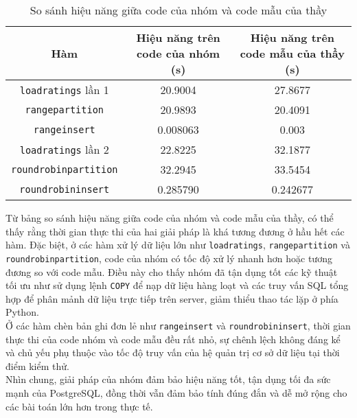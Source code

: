 \documentclass[a4paper]{article}
\begin{document}
\begin{table}[H]
    \centering
    \renewcommand{\arraystretch}{1.3}
    \begin{tabular}{|c|c|c|}
        \hline
        \textbf{Hàm} & \textbf{Hiệu năng trên code của nhóm (s)} & \textbf{Hiệu năng trên code mẫu của thầy (s)} \\
        \hline
        \texttt{loadratings} lần 1 & 20.9004 & 27.8677 \\
        \hline
        \texttt{rangepartition} & 20.9893 & 20.4091 \\
        \hline
        \texttt{rangeinsert} & 0.008063 & 0.003 \\
        \hline
        \texttt{loadratings} lần 2 & 22.8225 & 32.1877 \\
        \hline
        \texttt{roundrobinpartition} & 32.2945 & 33.5454 \\
        \hline
        \texttt{roundrobininsert} & 0.285790 & 0.242677 \\
        \hline
    \end{tabular}
    \caption{So sánh hiệu năng giữa code của nhóm và code mẫu của thầy}
\end{table}

Từ bảng so sánh hiệu năng giữa code của nhóm và code mẫu của thầy, có thể thấy rằng thời gian thực thi của hai giải pháp là khá tương đương ở hầu hết các hàm. Đặc biệt, ở các hàm xử lý dữ liệu lớn như \texttt{loadratings}, \texttt{rangepartition} và \texttt{roundrobinpartition}, code của nhóm có tốc độ xử lý nhanh hơn hoặc tương đương so với code mẫu. Điều này cho thấy nhóm đã tận dụng tốt các kỹ thuật tối ưu như sử dụng lệnh \texttt{COPY} để nạp dữ liệu hàng loạt và các truy vấn SQL tổng hợp để phân mảnh dữ liệu trực tiếp trên server, giảm thiểu thao tác lặp ở phía Python.\\

Ở các hàm chèn bản ghi đơn lẻ như \texttt{rangeinsert} và \texttt{roundrobininsert}, thời gian thực thi của code nhóm và code mẫu đều rất nhỏ, sự chênh lệch không đáng kể và chủ yếu phụ thuộc vào tốc độ truy vấn của hệ quản trị cơ sở dữ liệu tại thời điểm kiểm thử.\\

Nhìn chung, giải pháp của nhóm đảm bảo hiệu năng tốt, tận dụng tối đa sức mạnh của PostgreSQL, đồng thời vẫn đảm bảo tính đúng đắn và dễ mở rộng cho các bài toán lớn hơn trong thực tế.\\


\clearpage
\end{document}
